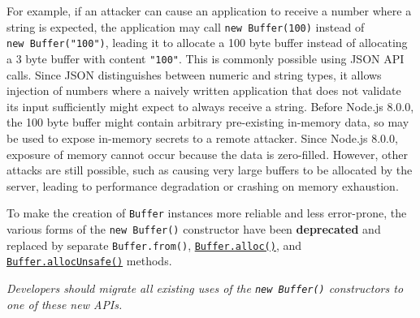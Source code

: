 For example, if an attacker can cause an application to receive a number
where a string is expected, the application may call
\texttt{new\ Buffer(100)} instead of \texttt{new\ Buffer("100")},
leading it to allocate a 100 byte buffer instead of allocating a 3 byte
buffer with content \texttt{"100"}. This is commonly possible using JSON
API calls. Since JSON distinguishes between numeric and string types, it
allows injection of numbers where a naively written application that
does not validate its input sufficiently might expect to always receive
a string. Before Node.js 8.0.0, the 100 byte buffer might contain
arbitrary pre-existing in-memory data, so may be used to expose
in-memory secrets to a remote attacker. Since Node.js 8.0.0, exposure of
memory cannot occur because the data is zero-filled. However, other
attacks are still possible, such as causing very large buffers to be
allocated by the server, leading to performance degradation or crashing
on memory exhaustion.

To make the creation of \texttt{Buffer} instances more reliable and less
error-prone, the various forms of the \texttt{new\ Buffer()} constructor
have been \textbf{deprecated} and replaced by separate
\texttt{Buffer.from()},
\hyperref[static-method-bufferallocsize-fill-encoding]{\texttt{Buffer.alloc()}},
and
\hyperref[static-method-bufferallocunsafesize]{\texttt{Buffer.allocUnsafe()}}
methods.

\emph{Developers should migrate all existing uses of the
\texttt{new\ Buffer()} constructors to one of these new APIs.}

